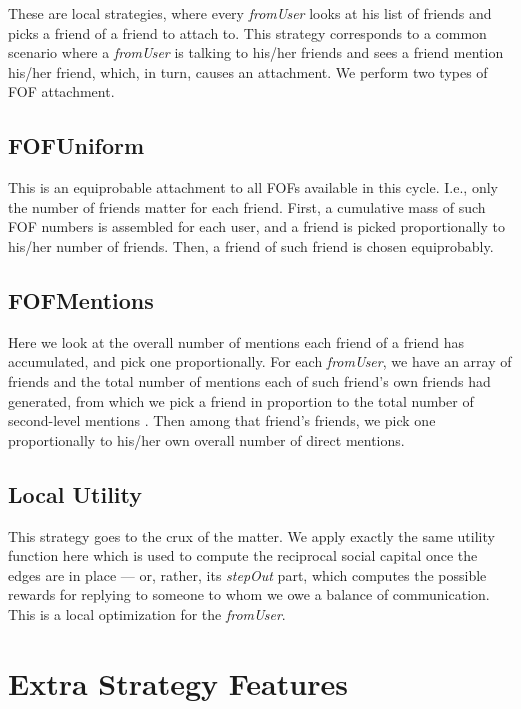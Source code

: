\documentclass[10pt,oneside]{memoir}
\begin{document}
These are local strategies, where every \emph{fromUser} looks at his list of friends and picks a friend of a friend to attach to.  This strategy corresponds to a common scenario where a \emph{fromUser} is talking to his/her friends and sees a friend mention his/her friend, which, in turn, causes an attachment.  We perform two types of FOF attachment.


\subsection{FOFUniform}
\label{fofuniform}

This is an equiprobable attachment to all FOFs available in this cycle.  I.e., only the number of friends matter for each friend.  First, a cumulative mass of such FOF numbers is assembled for each user, and a friend is picked proportionally to his/her number of friends.  Then, a friend of such friend is chosen equiprobably.


\subsection{FOFMentions}
\label{fofmentions}

Here we look at the overall number of mentions each friend of a friend has accumulated, and pick one proportionally.  For each {\itshape fromUser}, we have an array of friends and the total number of mentions each of such friend's own friends had generated, from which we pick a friend in proportion to the total number of second-level mentions .  Then among that friend's friends, we pick one proportionally to his/her own overall number of direct mentions.


\subsection{Local Utility}
\label{localutility}

This strategy goes to the crux of the matter.  We apply exactly the same utility function here which is used to compute the reciprocal social capital once the edges are in place --- or, rather, its {\itshape stepOut} part, which computes the possible rewards for replying to someone to whom we owe a balance of communication.  This is a local optimization for the {\itshape fromUser}. 


\section{Extra Strategy Features}
\label{extrastrategyfeatures}
\end{document}
